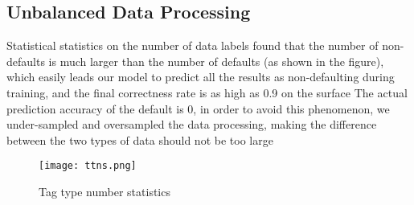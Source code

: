 \documentclass{mcmthesis}
\begin{document}
\subsection{Unbalanced Data Processing}
Statistical statistics on the number of data labels found that the number of non-defaults is much larger than the number of defaults (as shown in the figure), which easily leads our model to predict all the results as non-defaulting during training, and the final correctness rate is as high as 0.9 on the surface The actual prediction accuracy of the default is 0, in order to avoid this phenomenon, we under-sampled and oversampled the data processing, making the difference between the two types of data should not be too large
\newline
\begin{figure}[h]
\small
\centering
\texttt{[image: ttns.png]}
\caption{Tag type number statistics} \label{fig:Tag type number statistics}
\end{figure}
\end{document}
